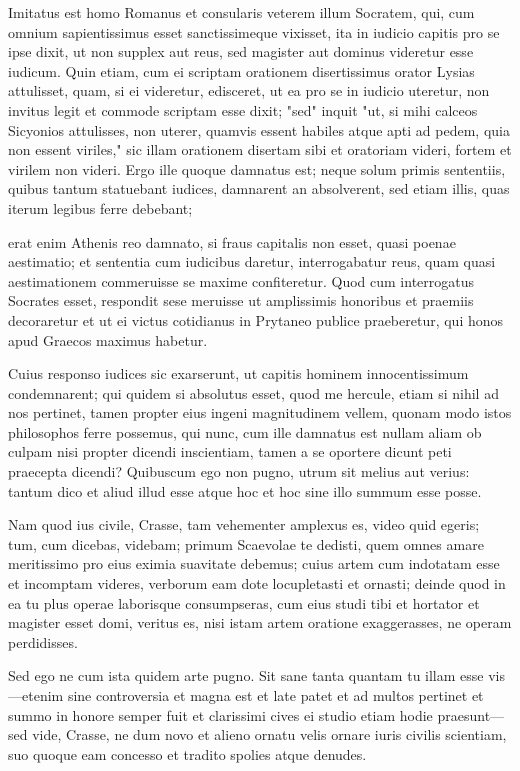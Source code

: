  Imitatus est homo Romanus et consularis veterem illum Socratem, qui, cum omnium sapientissimus esset sanctissimeque vixisset, ita in iudicio capitis pro se ipse dixit, ut non supplex aut reus, sed magister aut dominus videretur esse iudicum. Quin etiam, cum ei scriptam orationem disertissimus orator Lysias attulisset, quam, si ei videretur, edisceret, ut ea pro se in iudicio uteretur, non invitus legit et commode scriptam esse dixit; "sed" inquit "ut, si mihi calceos Sicyonios attulisses, non uterer, quamvis essent habiles atque apti ad pedem, quia non essent viriles," sic illam orationem disertam sibi et oratoriam videri, fortem et virilem non videri. Ergo ille quoque damnatus est; neque solum primis sententiis, quibus tantum statuebant iudices, damnarent an absolverent, sed etiam illis, quas iterum legibus ferre debebant;

 erat enim Athenis reo damnato, si fraus capitalis non esset, quasi poenae aestimatio; et sententia cum iudicibus daretur, interrogabatur reus, quam quasi aestimationem commeruisse se maxime confiteretur. Quod cum interrogatus Socrates esset, respondit sese meruisse ut amplissimis honoribus et praemiis decoraretur et ut ei victus cotidianus in Prytaneo publice praeberetur, qui honos apud Graecos maximus habetur.

 Cuius responso iudices sic exarserunt, ut capitis hominem innocentissimum condemnarent; qui quidem si absolutus esset, quod me hercule, etiam si nihil ad nos pertinet, tamen propter eius ingeni magnitudinem vellem, quonam modo istos philosophos ferre possemus, qui nunc, cum ille damnatus est nullam aliam ob culpam nisi propter dicendi inscientiam, tamen a se oportere dicunt peti praecepta dicendi? Quibuscum ego non pugno, utrum sit melius aut verius: tantum dico et aliud illud esse atque hoc et hoc sine illo summum esse posse.

 Nam quod ius civile, Crasse, tam vehementer amplexus es, video quid egeris; tum, cum dicebas, videbam; primum Scaevolae te dedisti, quem omnes amare meritissimo pro eius eximia suavitate debemus; cuius artem cum indotatam esse et incomptam videres, verborum eam dote locupletasti et ornasti; deinde quod in ea tu plus operae laborisque consumpseras, cum eius studi tibi et hortator et magister esset domi, veritus es, nisi istam artem oratione exaggerasses, ne operam perdidisses.

 Sed ego ne cum ista quidem arte pugno. Sit sane tanta quantam tu illam esse vis—etenim sine controversia et magna est et late patet et ad multos pertinet et summo in honore semper fuit et clarissimi cives ei studio etiam hodie praesunt—sed vide, Crasse, ne dum novo et alieno ornatu velis ornare iuris civilis scientiam, suo quoque eam concesso et tradito spolies atque denudes.

